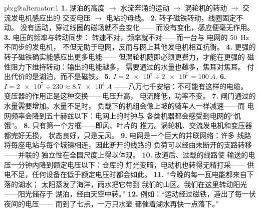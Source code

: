 \begin{solution}{pb:g9:alternator:1}
\textbf{1.} 湖泊的高度 $\to$ 水流奔涌的运动
$\to$ 涡轮机的转动 $\to$ 交流发电机感应出的
交变电压 $\to$ 电站的母线。
\textbf{2.} 转子磁铁转动，线圈固定不动。
没有运动，穿过线圈的磁场就不会变化——
而没有变化，感应便毫无作用。
\textbf{3.} 电压的频率与转动同步：
转速不对，频率就不对——而一台与
电网的 \qty{50}{Hz} 不同步的发电机，
不但无助于电网，反而与网上其他发电机相互抗衡。
\textbf{4.} 更强的转子磁铁确实能感应出更多电能——
但涡轮机随即必须更费力，才能在更强的
磁性阻力下维持转动：输出的电能越多，
需要通过的水量也越多，焦耳对焦耳。
付出代价的是湖泊，而不是磁铁。
\textbf{5.} $I = \num{2e7} \div \num{2e5} = \qty{100}{A}$.
\textbf{6.} $I = \num{2e7} \div 230 \approx \qty{8.7e4}{A}$
——八万七千安培：不可能有这样的电缆。
变压器的作用正是这种交换——电压升高，
电流降低，功率不变。
\textbf{7.} 闸门通过的水量需要增加。水量不足时，
负载下的机组会像上坡的骑车人一样减速——而
电网频率会降到五十赫兹以下：电网上的时钟与
各类机器都会感受到电网的“饥饿”。
\textbf{8.} 只有第一个方框——即风、叶片的
推力。涡轮机、交流发电机和变压器都完好无损，
状态良好，只是无风。
\textbf{9.} 电网是一个巨大的并联网络：许多
线路将每座电站与每个城镇相连，因此断开的线路的
负荷可以经由未断开的支路转移——并联的
独立性在全国尺度上得以体现。
\textbf{10.} 改道后、过载的线路使
输送的电压一分钟内降到额定电压以下：仓库的
灯光变暗，电动机也转得无精打采——
供电不足，任何设备在低于额定电压时都会如此。
\textbf{11.} “今晚的每一瓦电能都来自下落的湖水；
太阳蒸发了海洋，雨水把它带到
我们的山区。我们在这里转动阳光——阳光储存于
湖泊，经由天空中转。”
\textbf{12.} 例如：“运动经过磁铁，造出了每一伏夜间的电压——
而到了七点，一万只水壶
都催着湖水再快一点落下。”
\end{solution}
